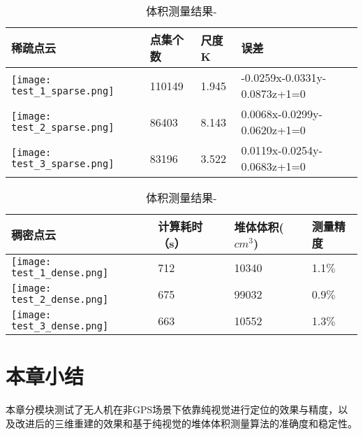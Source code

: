 \begin{table}[htb]
  \centering
  \caption{体积测量结果-\uppercase\expandafter{}}
  \label{tab:volume_test_2}
  \begin{tabular}{C{8cm}C{2.0cm}C{1.2cm}C{3.6cm}}
  \toprule
  \textbf{稀疏点云} & \textbf{点集个数} & \textbf{尺度K} & \textbf{误差}\\
  \midrule
  \texttt{[image: test\_1\_sparse.png]}  &110149&1.945&-0.0259x-0.0331y-0.0873z+1=0\\
  \texttt{[image: test\_2\_sparse.png]}  & 86403&8.143& 0.0068x-0.0299y-0.0620z+1=0\\
  \texttt{[image: test\_3\_sparse.png]}  & 83196&3.522& 0.0119x-0.0254y-0.0683z+1=0\\
  \bottomrule
  \end{tabular}
\end{table}


\begin{table}[htb]
  \centering
  \caption{体积测量结果-\uppercase\expandafter{}}
  \label{tab:volume_test_3}
  \begin{tabular}{C{8cm}C{2.4cm}C{2.4cm}C{2.0cm}}
  \toprule
  \textbf{稠密点云} & \textbf{计算耗时（s）} & \textbf{堆体体积($cm^3$)} & \textbf{测量精度}\\
  \midrule
  \texttt{[image: test\_1\_dense.png]}  & 712 & 10340  &   1.1$\%$\\
  \texttt{[image: test\_2\_dense.png]}  & 675 & 99032  &   0.9$\%$\\
  \texttt{[image: test\_3\_dense.png]}  & 663 & 10552  &   1.3$\%$\\
  \bottomrule
  \end{tabular}
\end{table}


\section{本章小结}
本章分模块测试了无人机在非GPS场景下依靠纯视觉进行定位的效果与精度，以及改进后的三维重建的效果和基于纯视觉的堆体体积测量算法的准确度和稳定性。